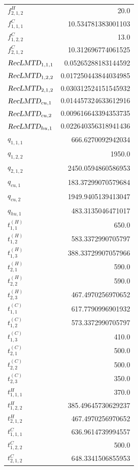 \documentclass{article}%
\begin{document}
\begin{multicols*}{3}
\begin{supertabular}{lr}
	$f_{2,1,2}^{H}$ & 20.0 \\%
	$f_{1,1,1}^{C}$ & 10.534781383001103 \\%
	$f_{1,2,2}^{C}$ & 13.0 \\%
	$f_{2,1,2}^{C}$ & 10.312696774061525 \\%
	$\textsl{RecLMTD}_{1,1,1}$ & 0.05265288183144592 \\%
	$\textsl{RecLMTD}_{1,2,2}$ & 0.017250443844034985 \\%
	$\textsl{RecLMTD}_{2,1,2}$ & 0.030312524151545932 \\%
	$\textsl{RecLMTD}_{cu,1}$ & 0.014457324633612916 \\%
	$\textsl{RecLMTD}_{cu,2}$ & 0.009616643394353735 \\%
	$\textsl{RecLMTD}_{hu,1}$ & 0.022640356318941436 \\%
	$q_{1,1,1}$ & 666.6270092942034 \\%
	$q_{1,2,2}$ & 1950.0 \\%
	$q_{2,1,2}$ & 2450.0594860586953 \\%
	$q_{cu,1}$ & 183.37299070579684 \\%
	$q_{cu,2}$ & 1949.9405139413047 \\%
	$q_{hu,1}$ & 483.3135046471017 \\%
	$t_{1,1}^{(H)}$ & 650.0 \\%
	$t_{1,2}^{(H)}$ & 583.3372990705797 \\%
	$t_{1,3}^{(H)}$ & 388.33729907057966 \\%
	$t_{2,1}^{(H)}$ & 590.0 \\%
	$t_{2,2}^{(H)}$ & 590.0 \\%
	$t_{2,3}^{(H)}$ & 467.4970256970652 \\%
	$t_{1,1}^{(C)}$ & 617.7790996901932 \\%
	$t_{1,2}^{(C)}$ & 573.3372990705797 \\%
	$t_{1,3}^{(C)}$ & 410.0 \\%
	$t_{2,1}^{(C)}$ & 500.0 \\%
	$t_{2,2}^{(C)}$ & 500.0 \\%
	$t_{2,3}^{(C)}$ & 350.0 \\%
	$t_{1,1,1}^{H}$ & 370.0 \\%
	$t_{1,2,2}^{H}$ & 385.49645730629237 \\%
	$t_{2,1,2}^{H}$ & 467.4970256970652 \\%
	$t_{1,1,1}^{C}$ & 636.9614739994557 \\%
	$t_{1,2,2}^{C}$ & 500.0 \\%
	$t_{2,1,2}^{C}$ & 648.3341506855953 \\%

\end{supertabular}
\end{multicols*}
\end{document}
